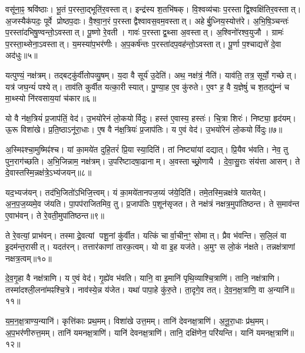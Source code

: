 वसू॑ना॒ꣴ॒ श्रवि॑ष्ठाः।
भू॒तं प॒रस्ता॒द्भूति॑र॒वस्तात्।
इन्द्र॑स्य श॒तभि॑षक्।
वि॒श्वव्य॑चाः प॒रस्ताद्वि॒श्वक्षि॑तिर॒वस्तात्।
अ॒जस्यैक॑पदः॒ पूर्वे प्रोष्ठप॒दाः।
वै॒श्वा॒न॒रं प॒रस्ताद्वैश्वावस॒वम॒\-वस्तात्।
अहेर्बु॒ध्निय॒स्योत्त॑रे।
अ॒भि॒षि॒ञ्चन्तः॑ प॒रस्ता॑दभि\-षु॒ण्वन्तो॒\-ऽवस्तात्।
पू॒ष्णो रे॒वती।
गावः॑ प॒रस्ताद्व॒थ्सा अ॒वस्तात्।
अ॒श्विनो॑रश्व॒युजौ।
ग्रामः॑ प॒रस्ता॒थ्सेना॒\-ऽवस्तात्।
य॒मस्या॑प॒भर॑णीः।
अ॒प॒कर्\mbox{}ष॑न्तः प॒रस्ता॑दप॒वह॑न्तो॒\-ऽवस्तात्।
पू॒र्णा प॒श्चाद्यत्ते॑ दे॒वा अद॑धुः॥५॥\anuvakamend[आ॒र्द्रम॒वस्ता॒द्वह॑माना अ॒वस्ता॑द॒भ्यारू॑ढम॒वस्ता॒त्पन्था॑ अ॒वस्ताद्व॒थ्सा अ॒वस्ता॒त्पञ्च॑ च]

यत्पुण्यं॒ नक्ष॑त्रम्।
तद्बट्कु॑र्वीतोपव्यु॒षम्।
य॒दा वै सूर्य॑ उ॒देति॑।
अथ॒ नक्ष॑त्रं॒ नैति॑।
याव॑ति॒ तत्र॒ सूर्यो॒ गच्छेत्।
यत्र॑ जघ॒न्यं॑ पश्येत्।
ताव॑ति कुर्वीत यत्का॒री स्यात्।
पु॒ण्या॒ह ए॒व कु॑रुते।
ए॒वꣳ ह॒ वै य॒ज्ञेषुं॑ च श॒तद्यु॑म्नं च मा॒थ्स्यो नि॑रवसाय॒यां च॑कार॥६॥

यो वै न॑क्ष॒त्रियं॑ प्र॒जाप॑तिं॒ वेद॑।
उ॒भयो॑रेनं लो॒कयोर्विदुः।
हस्त॑ ए॒वास्य॒ हस्तः॑।
चि॒त्रा शिरः॑।
निष्ट्या॒ हृद॑यम्।
ऊ॒रू विशा॑खे।
प्र॒ति॒ष्ठा\-ऽनू॑रा॒धाः।
ए॒ष वै न॑क्ष॒त्रियः॑ प्र॒जाप॑तिः।
य ए॒वं वेद॑।
उ॒भयो॑रेनं लो॒कयोर्विदुः॥७॥

अ॒स्मिꣴश्चा॒मुष्मिꣴ॑श्च।
यां का॒मये॑त दुहि॒तरं॑ प्रि॒या स्या॒दिति॑।
तां निष्ट्या॑यां दद्यात्।
प्रि॒यैव भ॑वति।
नेव॒ तु पुन॒राग॑च्छति।
अ॒भि॒जिन्नाम॒ नक्ष॑त्रम्।
उ॒परि॑ष्टादषा॒ढानाम्।
अ॒वस्ताच्छ्रो॒णायै।
दे॒वा॒सु॒राः संय॑त्ता आसन्।
ते दे॒वास्तस्मि॒न्नक्ष॑त्रे॒\-ऽभ्य॑जयन्॥८॥

यद॒भ्यज॑यन्।
तद॑भि॒जितो॑\-ऽभिजि॒त्त्वम्।
यं का॒मये॑तानप\-ज॒य्यं ज॑ये॒दिति॑।
तमे॒तस्मि॒न्नक्ष॑त्रे यातयेत्।
अ॒न॒प॒ज॒य्यमे॒व ज॑यति।
पा॒पप॑राजितमिव॒ तु।
प्र॒जाप॑तिः प॒शून॑सृजत।
ते नक्ष॑त्रं नक्षत्र॒मुपा॑तिष्ठन्त।
ते स॒माव॑न्त ए॒वाभ॑वन्।
ते रे॒वती॒मुपा॑तिष्ठन्त॥९॥

ते रे॒वत्यां॒ प्राभ॑वन्।
तस्माद्रे॒वत्यां पशू॒नां कु॑र्वीत।
यत्किं चार्वा॒चीन॒ꣳ॒ सोमात्।
प्रैव भ॑वन्ति।
स॒लि॒लं वा इ॒दम॑न्त॒रासीत्।
यदत॑रन्।
तत्तार॑काणां तारक॒त्वम्।
यो वा इ॒ह यज॑ते।
अ॒मुꣳ स लो॒कं न॑क्षते।
तन्नक्ष॑त्राणां नक्षत्र॒त्वम्॥१०॥

दे॒व॒गृ॒हा वै नक्ष॑त्राणि।
य ए॒वं वेद॑।
गृ॒ह्ये॑व भ॑वति।
यानि॒ वा इ॒मानि॑ पृथि॒व्याश्चि॒त्राणि॑।
तानि॒ नक्ष॑त्राणि।
तस्मा॑दश्ली॒लना॑मꣴश्चि॒त्रे।
नाव॑स्ये॒न्न य॑जेत।
यथा॑ पापा॒हे कु॑रु॒ते।
ता॒दृगे॒व तत्।
दे॒व॒न॒क्ष॒त्राणि॒ वा अ॒न्यानि॑॥११॥

य॒म॒न॒क्ष॒त्राण्य॒न्यानि॑।
कृत्ति॑काः प्रथ॒मम्।
विशा॑खे उत्त॒मम्।
तानि॑ देवनक्ष॒त्राणि॑।
अ॒नू॒रा॒धाः प्र॑थ॒मम्।
अ॒प॒भर॑णीरुत्त॒मम्।
तानि॑ यमनक्ष॒त्राणि॑।
यानि॑ देवनक्ष॒त्राणि॑।
तानि॒ दक्षि॑णेन॒ परि॑यन्ति।
यानि॑ यमनक्ष॒त्राणि॑॥१२॥


